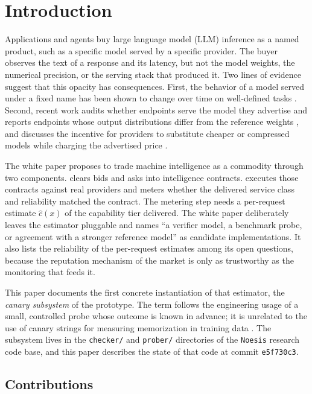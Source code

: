 \section{Introduction}
\label{sec:introduction}

Applications and agents buy large language model (LLM) inference as a named
product, such as a specific model served by a specific provider. The buyer
observes the text of a response and its latency, but not the model weights, the
numerical precision, or the serving stack that produced it. Two lines of
evidence suggest that this opacity has consequences. First, the behavior of a
model served under a fixed name has been shown to change over time on
well-defined tasks \cite{chen2023drift}. Second, recent work audits whether
endpoints serve the model they advertise and reports endpoints whose output
distributions differ from the reference weights \cite{gao2025equality}, and
discusses the incentive for providers to substitute cheaper or compressed
models while charging the advertised price \cite{cai2025substitution}.

The \Noesis{} white paper \cite{noesis_whitepaper} proposes to trade machine
intelligence as a commodity through two components. \NoesisMarket{} clears
bids and asks into intelligence contracts. \NoesisServer{} executes those
contracts against real providers and meters whether the delivered service class
and reliability matched the contract. The metering step needs a
per-request estimate $\hat c(x)$ of the capability tier delivered. The white
paper deliberately leaves the estimator pluggable and names ``a verifier model,
a benchmark probe, or agreement with a stronger reference model'' as candidate
implementations. It also lists the reliability of the per-request estimates
among its open questions, because the reputation mechanism of the market is
only as trustworthy as the monitoring that feeds it.

This paper documents the first concrete instantiation of that estimator, the
\emph{canary subsystem} of the \Noesis{} prototype. The term follows the
engineering usage of a small, controlled probe whose outcome is known in
advance; it is unrelated to the use of canary strings for measuring
memorization in training data \cite{carlini2019secret}. The subsystem lives in
the \texttt{checker/} and \texttt{prober/} directories of the \texttt{Noesis}
research code base, and this paper describes the state of that code at commit
\texttt{e5f730c3}.

\subsection{Contributions}
\label{sec:contributions}

